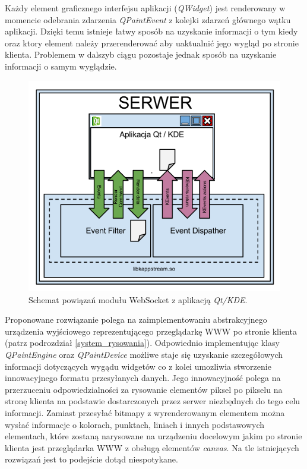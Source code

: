 
Każdy element graficznego interfejsu aplikacji (\emph{QWidget}) jest renderowany w momencie odebrania zdarzenia \emph{QPaintEvent} z kolejki zdarzeń głównego wątku aplikacji. Dzięki temu istnieje łatwy sposób na uzyskanie informacji o tym kiedy oraz ktory element należy przerenderować aby uaktualnić jego wygląd po stronie klienta. Problemem w dalszyb ciągu pozostaje jednak sposób na uzyskanie informacji o samym wyglądzie. 

\begin{figure}
\centering
\includegraphics[width=1.0\linewidth]{img/arch-hook}
\caption{Schemat powiązań modułu WebSocket z aplikacją \emph{Qt/KDE}.}
\label{fig:arch-hook}
\end{figure}

Proponowane rozwiązanie polega na zaimplementowaniu abstrakcyjnego urządzenia wyjściowego reprezentującego przeglądarkę WWW po stronie klienta (patrz podrozdział \ref{system_rysowania}). Odpowiednio implementując klasy \emph{QPaintEngine} oraz \emph{QPaintDevice} możliwe staje się uzyskanie szczegółowych informacji dotyczących wygądu widgetów co z kolei umozliwia stworzenie innowacyjnego formatu przesyłanych danych. Jego innowacyjność polega na przerzuceniu odpowiedzialności za rysowanie elementów piksel po pikselu na stronę klienta na podstawie dostarczonych przez serwer niezbędnych do tego celu informacji. Zamiast przesyłać bitmapy z wyrenderowanym elementem można wysłać informacje o kolorach, punktach, liniach i innych podstawowych elementach, które zostaną narysowane na urządzeniu docelowym jakim po stronie klienta jest przeglądarka WWW z obsługą elementów \emph{canvas}. Na tle istniejących rozwiązań jest to podejście dotąd niespotykane.
